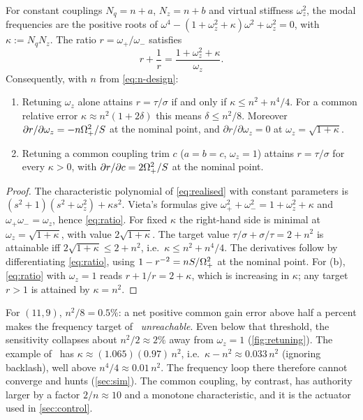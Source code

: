 \begin{proposition}\label{prop:authority}
For constant couplings $N_q=n+a$, $N_z=n+b$ and virtual stiffness $\omega_z^2$,
the modal frequencies are the positive roots of
$\omega^4-(1+\omega_z^2+\kappa)\omega^2+\omega_z^2=0$, with $\kappa:=N_qN_z$.
The ratio $r=\omega_+/\omega_-$ satisfies
\begin{equation}\label{eq:ratio}
  r+\frac1r=\frac{1+\omega_z^2+\kappa}{\omega_z}.
\end{equation}
Consequently, with $n$ from \eqref{eq:n-design}:
\begin{enumerate}
\item[(a)] Retuning $\omega_z$ alone attains $r=\tau/\sigma$ if and only if
  $\kappa\le n^2+n^4/4$.
  For a common relative error $\kappa\approx n^2(1+2\delta)$ this means
  $\delta\le n^2/8$.
  Moreover $\partial r/\partial\omega_z=-n\Omega_+^2/S$ at the nominal point, and
  $\partial r/\partial\omega_z=0$ at $\omega_z=\sqrt{1+\kappa}$.
\item[(b)] Retuning a common coupling trim $c$ ($a=b=c$, $\omega_z=1$) attains
  $r=\tau/\sigma$ for every $\kappa>0$, with $\partial r/\partial c=2\Omega_+^2/S$ at
  the nominal point.
\end{enumerate}
\end{proposition}
\begin{proof}
The characteristic polynomial of \eqref{eq:realised} with constant parameters is
$(s^2+1)(s^2+\omega_z^2)+\kappa s^2$.
Vieta's formulas give $\omega_+^2+\omega_-^2=1+\omega_z^2+\kappa$ and
$\omega_+\omega_-=\omega_z$, hence \eqref{eq:ratio}.
For fixed $\kappa$ the right-hand side is minimal at $\omega_z=\sqrt{1+\kappa}$,
with value $2\sqrt{1+\kappa}$.
The target value $\tau/\sigma+\sigma/\tau=2+n^2$ is attainable iff
$2\sqrt{1+\kappa}\le2+n^2$, i.e.\ $\kappa\le n^2+n^4/4$.
The derivatives follow by differentiating \eqref{eq:ratio}, using
$1-r^{-2}=nS/\Omega_+^2$ at the nominal point.
For (b), \eqref{eq:ratio} with $\omega_z=1$ reads $r+1/r=2+\kappa$, which is
increasing in $\kappa$; any target $r>1$ is attained by $\kappa=n^2$.
\end{proof}

For $(11,9)$, $n^2/8=0.5\%$: a net positive common gain error above half a
percent makes the frequency target of~\citet{juchem2027restoring}
\emph{unreachable}.
Even below that threshold, the sensitivity collapses about $n^2/2\approx2\%$ away
from $\omega_z=1$ (\cref{fig:retuning}).
The example of~\citet{juchem2027restoring} has
$\kappa\approx(1.065)(0.97)\,n^2$, i.e.\ $\kappa-n^2\approx0.033\,n^2$
(ignoring backlash), well above $n^4/4\approx0.01\,n^2$.
The frequency loop there therefore cannot converge and hunts
(\cref{sec:sim}).
The common coupling, by contrast, has authority larger by a factor $2/n\approx10$
and a monotone characteristic, and it is the actuator used in \cref{sec:control}.


